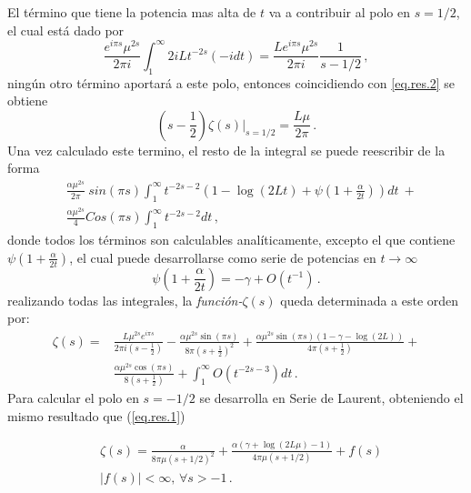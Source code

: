 El término que tiene la potencia mas alta de $t$ va a contribuir al polo en $s=1/2$, el cual está dado por
\begin{equation}
    \frac{e^{i \pi s} \mu ^{2s} }{2 \pi i }
    \int _1 ^{\infty}
    2 i L    
    t ^{-2 s}
    (-i dt) =  
    \frac{L e^{i \pi s} \mu ^{2s}}{2 \pi i} \frac{1}{s-1/2   }
    	\, ,
\end{equation}
ningún otro término aportará a este polo, entonces coincidiendo con \ref{eq.res.2} se obtiene
\begin{equation}
	\left(s- \frac{1}{2} \right)
    \zeta (s) \Big| _{s=1/2} = \frac{L \mu }{2 \pi} 
    	\, .
\end{equation}
Una vez calculado este termino, el resto de la integral se puede reescribir de la forma
\begin{align}
    & \frac{\alpha \mu ^{2s} }{2 \pi} \ sin(\pi s)
    \int _1 ^{\infty}
    t ^{-2 s-2} 
    \left(
    1 -  \log (2Lt) + \psi \left( 1 + \frac{\alpha}{2t} \right)
    \right) dt \ + 
    	\nonumber \\[5pt]
    &
    \frac{\alpha \mu ^{2s} }{4} 
    Cos(\pi s)
    \int _1 ^{\infty} t^{-2s-2} dt
    	\, ,
\end{align}
donde todos los términos son calculables analíticamente, excepto el que contiene $\psi \left( 1 + \frac{\alpha}{2t} \right)$, el cual puede desarrollarse como serie de potencias en $t \rightarrow \infty$
\begin{equation}
    \psi \left(1 + \frac{\alpha}{2 t} \right) =
    - \gamma + O \left( t^{-1} \right)
    \, .
\end{equation}
realizando todas las integrales, la {\it función-$\zeta (s)$} queda determinada a este orden por:  
\begin{equation}\label{eq.laurent}
\begin{aligned}
    \zeta  (s)  = 
    & \frac{L \mu ^{2 s} e ^{i \pi s}}{2 \pi i (s-\frac{1}{2})}  
    -\frac{\alpha \mu ^{2s} \sin(\pi s)}{8 \pi (s+\frac{1}{2}) ^2}  + 
    \frac{\alpha \mu ^{2s} \sin  (\pi s) (1 - \gamma -   \log (2 L))}{4 \pi (s+ \frac{1}{2} )} + \\
    & \frac{\alpha \mu ^{2s} \cos(\pi s)}{8 (s+\frac{1}{2} )} +
    \int _1 ^{\infty} O \left( t ^{-2s-3} \right) dt
    	\, .
\end{aligned}
\end{equation}
Para calcular el polo en $s=-1/2$ se desarrolla en Serie de Laurent, obteniendo el mismo resultado que (\ref{eq.res.1})


\begin{align}
\nonumber	
    &\zeta  (s) =  \frac{\alpha}{8  \pi \mu (s+1/2)^2} +
    \frac{ \alpha ( \gamma  +  \log (2L \mu ) -1 ) }{4  \pi \mu (s+1/2) }  + 
	f (s) \\
	&| f(s) | < \infty , \, \forall s > -1
    	\, .
\end{align}


